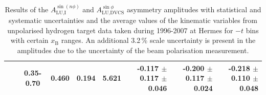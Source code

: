 \documentclass[11pt,a4paper]{article}
\begin{document}
\begin{table}[width=15cm]
\begin{center}
{\begin{tabular}{|cc|c|c|c|c|r|r|r|}
& & 0.35-0.70 & 0.460  & 0.194 & 5.621  &  -0.117  $\pm$  0.117  $\pm$  0.046 &
 -0.200 $\pm$  0.117  $\pm$  0.024  & -0.218 $\pm$ 0.110 $ \pm$ 0.048 \\
\hline
  \end{tabular}
}
 \end{center}
\caption{Results of the $A_{\textrm{LU,I}}^{\sin(n\phi)}$ and
  $A_{\textrm{LU,DVCS}}^{\sin \phi}$ asymmetry amplitudes with
  statistical and systematic uncertainties and the average values of
  the kinematic variables from unpolarised hydrogen target data taken during 1996-2007 at H{\sc ermes} for $-t$ bins with certain $x_{\textrm{B}}$ ranges.
An additional 3.2\,\% scale uncertainty is present in the amplitudes due to the uncertainty of
the beam polarisation measurement.}
\end{table}
\end{document}
